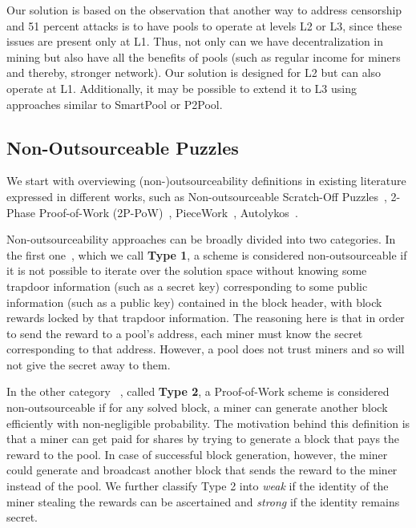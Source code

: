 \documentclass[runningheads]{llncs}
\begin{document}
Our solution is based on the observation that another way to address censorship and 51 percent attacks is to have pools to operate at levels L2 or L3, since these issues are present only at L1. Thus, not only can we have decentralization in mining but also have all the benefits of pools (such as regular income for miners and thereby, stronger network). Our solution is designed for L2 but can also operate at L1. Additionally, it may be possible to extend it to L3 using approaches similar to SmartPool or P2Pool. 

\subsection{Non-Outsourceable Puzzles}

We start with overviewing (non-)outsourceability definitions in existing literature expressed in different works, such as
Non-outsourceable Scratch-Off Puzzles~\cite{miller2015nonoutsourceable}, 2-Phase Proof-of-Work (2P-PoW)~\cite{twophase},
PieceWork~\cite{daian2017short}, Autolykos~\cite{autolykos}.


Non-outsourceability approaches can be broadly divided into two categories. In the first one~\cite{autolykos,daian2017short,twophase}, which we call \textbf{Type 1}, a scheme is considered
non-outsourceable if it is not possible to iterate over the solution space without knowing some trapdoor information (such as a secret key) corresponding to some public information (such as a public key) contained in the block header, with block rewards locked by that trapdoor information. The reasoning here is that in order to send the reward to a pool's address, each miner must know the secret corresponding to that address. However, a pool does not trust miners and so will not give the secret away to them. 

In the other category
~\cite{miller2015nonoutsourceable}, called \textbf{Type 2}, a Proof-of-Work scheme is considered non-outsourceable if for any solved block, a miner can generate another block efficiently with non-negligible probability. The motivation behind this definition is that a miner can get paid for shares
by trying to generate a block that pays the reward to the pool. In case of successful block generation, however, the miner could generate and broadcast another block that sends the reward to the miner instead of the pool. 
We further classify Type 2 into {\em weak} if the identity of the miner stealing the rewards can be ascertained and {\em strong} if the identity remains secret.
\end{document}
